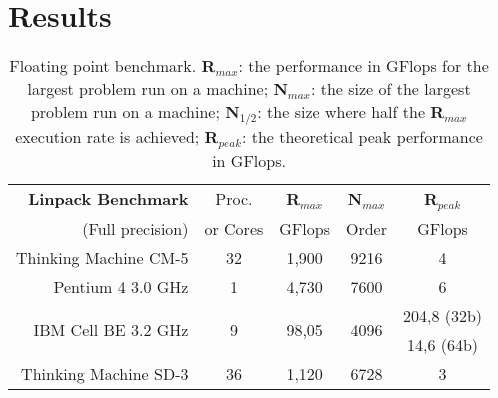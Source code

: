 \section{Results}
\blindtext

\begin{table}[!htpb]
    \caption{Floating point benchmark.
	\textbf{R$_{max}$}: the performance in GFlops for the largest problem run on a machine; \textbf{N$_{max}$}: the size of the largest problem run on a machine; \textbf{N$_{1/2}$}: the size where half the \textbf{R$_{max}$} execution rate is achieved; \textbf{R$_{peak}$}: the theoretical peak performance in GFlops.}
    \label{tab:table-01}
    \centering
    \begin{tabularx}{\linewidth}{rcccc}
        \toprule
        \textbf{Linpack	Benchmark}& Proc. & \textbf{R$_{max}$} & \textbf{N$_{max}$} & \textbf{R$_{peak}$} \\ 
        (Full precision) & or Cores	& GFlops & Order & GFlops \\ [0.25ex] 
        \midrule
        Thinking Machine CM-5 & 32 & 1,900 & 9216 & 4 \\
        Pentium 4 3.0 GHz & 1 & 4,730 & 7600 & 6 \\
        \multirow{2}{*}{IBM Cell BE 3.2 GHz} & \multirow{2}{*}{9} & \multirow{2}{*}{98,05} & \multirow{2}{*}{4096} & 204,8 \scriptsize{(32b)} \\
        & & & & 14,6 \scriptsize{(64b)} \\
        Thinking Machine SD-3 & 36 & 1,120 & 6728 & 3 \\
        \bottomrule
    \end{tabularx}
\end{table}